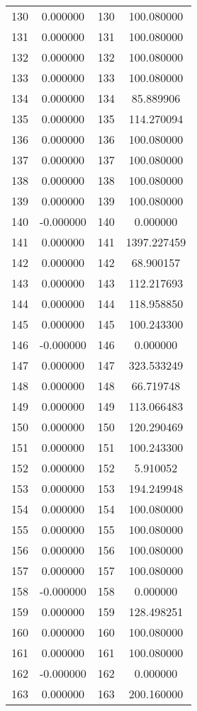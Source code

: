 \documentclass[12pt]{article}
\begin{document}
\begin{longtable}{@{}cccc@{}}
130 & 0.000000 & 130 & 100.080000 \\
131 & 0.000000 & 131 & 100.080000 \\
132 & 0.000000 & 132 & 100.080000 \\
133 & 0.000000 & 133 & 100.080000 \\
134 & 0.000000 & 134 & 85.889906 \\
135 & 0.000000 & 135 & 114.270094 \\
136 & 0.000000 & 136 & 100.080000 \\
137 & 0.000000 & 137 & 100.080000 \\
138 & 0.000000 & 138 & 100.080000 \\
139 & 0.000000 & 139 & 100.080000 \\
140 & -0.000000 & 140 & 0.000000 \\
141 & 0.000000 & 141 & 1397.227459 \\
142 & 0.000000 & 142 & 68.900157 \\
143 & 0.000000 & 143 & 112.217693 \\
144 & 0.000000 & 144 & 118.958850 \\
145 & 0.000000 & 145 & 100.243300 \\
146 & -0.000000 & 146 & 0.000000 \\
147 & 0.000000 & 147 & 323.533249 \\
148 & 0.000000 & 148 & 66.719748 \\
149 & 0.000000 & 149 & 113.066483 \\
150 & 0.000000 & 150 & 120.290469 \\
151 & 0.000000 & 151 & 100.243300 \\
152 & 0.000000 & 152 & 5.910052 \\
153 & 0.000000 & 153 & 194.249948 \\
154 & 0.000000 & 154 & 100.080000 \\
155 & 0.000000 & 155 & 100.080000 \\
156 & 0.000000 & 156 & 100.080000 \\
157 & 0.000000 & 157 & 100.080000 \\
158 & -0.000000 & 158 & 0.000000 \\
159 & 0.000000 & 159 & 128.498251 \\
160 & 0.000000 & 160 & 100.080000 \\
161 & 0.000000 & 161 & 100.080000 \\
162 & -0.000000 & 162 & 0.000000 \\
163 & 0.000000 & 163 & 200.160000 \\

\end{longtable}
\end{document}
